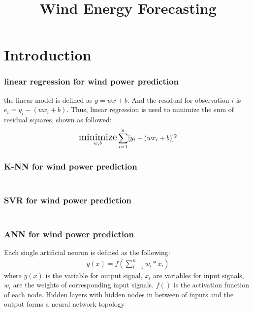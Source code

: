 \documentclass[a4paper, article, oneside, USenglish, IN5460]{memoir}
\title{ Wind Energy Forecasting }
\DeclareMathOperator*{\min}{\text{\Large minimize}}
\begin{document}
\shorthandoff{}

\projectfrontpage


\chapter{Introduction}
\subsection{linear regression for wind power prediction}
the linear model is defined as $y=wx+b$.
And the residual for observation $i$ is $e_i =y_i -(wx_i+b)$. Thus, linear regression is used to minimize the sum of residual squares, shown as followed:
\begin{equation}
\begin{aligned}
\min_{w,b}\sum_{i=1}^{n} [y_i-(wx_i+b)]^2
\end{aligned}
\end{equation}
\newline


\subsection{K-NN for wind power prediction}
\begin{equation}
\begin{aligned}

\end{aligned}
\end{equation}
\newline

\subsection{SVR for wind power prediction}
\begin{equation}
\begin{aligned}

\end{aligned}
\end{equation}
\newline


\subsection{ANN for wind power prediction}
Each single artificial neuron is defined as the following: 
\begin{equation}
\begin{aligned}
y(x) = f(\sum_{i=1}^{n} w_i*x_i)
\end{aligned}
\end{equation}
where $y(x)$ is the variable for output signal, $x_i$ are variables for input signals, $w_i$ are the weights of corresponding input signals. $f()$ is the activation function of each node. Hidden layers with hidden nodes in between of inputs and the output forms a neural network topology
\newline
\end{document}
